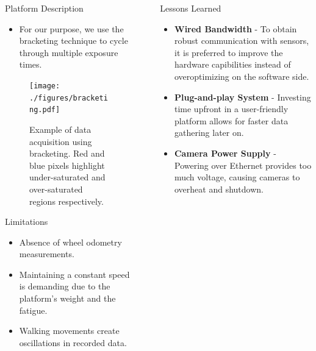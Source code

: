 \documentclass[final,hyperref={pdfpagelabels=false}]{beamer}
\begin{document}
\begin{frame}[t]
\begin{columns}[t]
\begin{column}{.484\textwidth}
\begin{block}{Platform Description}
	\begin{itemize}
		\item For our purpose, we use the bracketing technique to cycle through multiple exposure times.
	\end{itemize}
	\begin{figure}%
		\texttt{[image: ./figures/bracketing.pdf]}
		\captionsetup{width = 0.975\linewidth, justification=justified, name=Figure 3}
		\caption{
			Example of data acquisition using bracketing. Red  and blue pixels highlight under-saturated and over-saturated regions respectively.
			}
	\end{figure}
\end{block}

\begin{block}{Limitations}
	\begin{itemize}
		\item Absence of wheel odometry measurements.
		\item Maintaining a constant speed is demanding due to the platform's weight and the fatigue.
		\item Walking movements create oscillations in recorded data.
	\end{itemize}
\end{block}



\end{column} %

\begin{column}{.02\textwidth}\end{column} %
 
\begin{column}{.484\textwidth} %


\vspace{-12.5mm}
\begin{block}{Lessons Learned}
	\begin{itemize}
		\item \textbf{Wired Bandwidth} - To obtain robust communication with sensors, it is preferred to improve the hardware capibilities instead of overoptimizing on the software side.
		\item \textbf{Plug-and-play System} -  Investing time upfront in a user-friendly platform allows for faster data gathering later on. %
		\item \textbf{Camera Power Supply} - Powering over Ethernet provides too much voltage, causing cameras to overheat and shutdown.
	\end{itemize}
\end{block}



\end{column}
\end{columns}
\end{frame}
\end{document}
